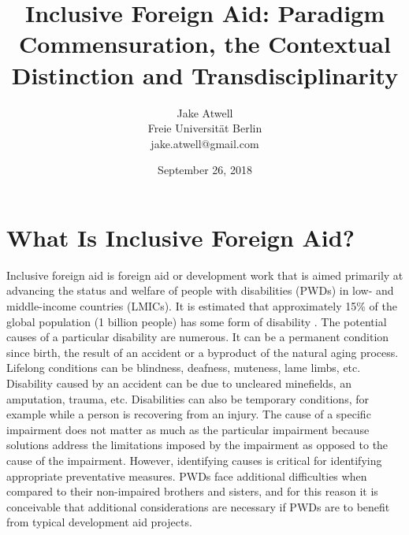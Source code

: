 \documentclass[a4paper]{article}
\begin{document}
\title{Inclusive Foreign Aid: Paradigm Commensuration, the Contextual
Distinction and Transdisciplinarity}
\author{Jake Atwell\\
    Freie Universität Berlin\\
    jake.atwell@gmail.com
}
\date{September 26, 2018}

\maketitle



\newpage


\tableofcontents

\newpage
{} %




\section{What Is Inclusive Foreign Aid?}

Inclusive foreign aid is foreign aid or development work that is aimed
primarily at advancing the status and welfare of people with disabilities
(PWDs) in low- and middle-income countries (LMICs). It is estimated that
approximately 15\% of the global population (1 billion people) has some form
of disability \citep{banks2017poverty}. The potential causes of a particular
disability are numerous. It can be a permanent condition since birth, the
result of an accident or a byproduct of the natural aging process. Lifelong
conditions can be blindness, deafness, muteness, lame limbs, etc. Disability
caused by an accident can be due to uncleared minefields, an amputation,
trauma, etc. Disabilities can also be temporary conditions, for example while
a person is recovering from an injury. The cause of a specific impairment does
not matter as much as the particular impairment because solutions address the
limitations imposed by the impairment as opposed to the cause of the
impairment. However, identifying causes is critical for identifying
appropriate preventative measures. PWDs face additional difficulties when
compared to their non-impaired brothers and sisters, and for this reason it is
conceivable that additional considerations are necessary if PWDs are to
benefit from typical development aid projects.
\end{document}
